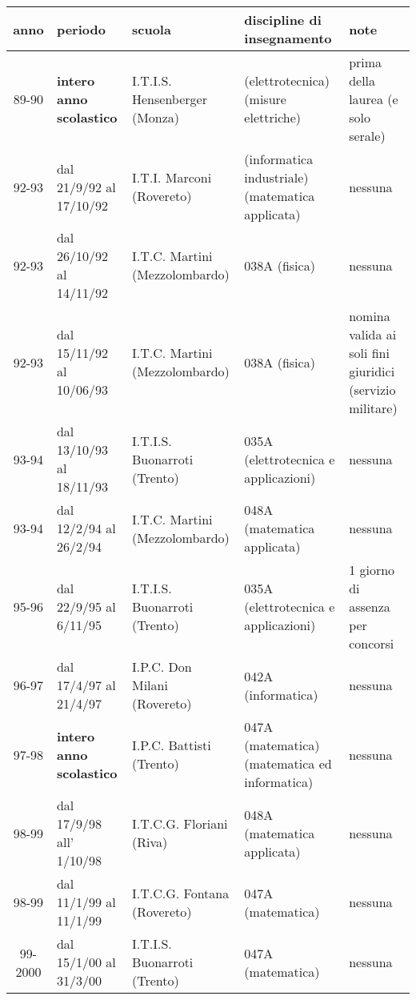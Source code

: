 \begin{center}
\begin{tabular}[c]{||c|p{0.80in}|p{1.25in}|p{1.25in}|p{1.25in}||}
 \hline \hline
  anno      & periodo & scuola & discipline di insegnamento & note\\
 \hline \hline
  89-90     & {\bf intero anno scolastico} & I.T.I.S. Hensenberger (Monza)
            & (elettrotecnica) (misure elettriche)
            & prima della laurea (e solo serale) \\
 \hline \hline
  92-93     & dal 21/9/92 al 17/10/92
            & I.T.I. Marconi (Rovereto)
            & (informatica industriale) %
              (matematica applicata) %
            & nessuna \\
  92-93     & dal 26/10/92 al 14/11/92 & I.T.C. Martini (Mezzolombardo)
            & 038A (fisica) & nessuna \\
  92-93     & dal 15/11/92 al 10/06/93 & I.T.C. Martini (Mezzolombardo)
            & 038A (fisica)
            & nomina valida ai soli fini giuridici (servizio militare) \\
 \hline \hline
  93-94     & dal 13/10/93 al 18/11/93 & I.T.I.S. Buonarroti (Trento)
            & 035A (elettrotecnica e applicazioni) & nessuna \\
  93-94     & dal 12/2/94 al 26/2/94 & I.T.C. Martini (Mezzolombardo)
            & 048A (matematica applicata) & nessuna \\
 \hline \hline
  95-96     & dal 22/9/95 al 6/11/95 & I.T.I.S. Buonarroti (Trento)
            & 035A (elettrotecnica e applicazioni) & 1 giorno di
  assenza per concorsi \\
 \hline \hline
  96-97   & dal 17/4/97 al 21/4/97 & I.P.C. Don Milani (Rovereto)
            & 042A (informatica) & nessuna \\
 \hline \hline
  97-98     & {\bf intero anno scolastico} & I.P.C. Battisti (Trento)
            & 047A (matematica) (matematica ed informatica)
            & nessuna \\
 \hline \hline
  98-99   & dal 17/9/98 all' 1/10/98 & I.T.C.G. Floriani (Riva)
            & 048A (matematica applicata) & nessuna \\
  98-99   & dal 11/1/99 al 11/1/99 & I.T.C.G. Fontana (Rovereto)
            & 047A (matematica) & nessuna \\
 \hline \hline
  99-2000   & dal 15/1/00 al 31/3/00 & I.T.I.S. Buonarroti (Trento)
            & 047A (matematica) & nessuna \\
 \hline \hline
\end{tabular}
\end{center}


